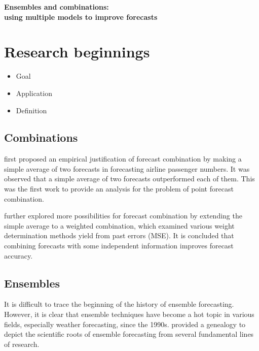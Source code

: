\documentclass[11pt]{article}
\begin{document}
\def\spacingset#1{\renewcommand{\baselinestretch}%
{#1}\small\normalsize} \spacingset{1}

\begin{center}
{\bf\Large Ensembles and combinations:\\using multiple models to improve forecasts}
\end{center}


\bigskip


\spacingset{1.5} 

\section{Research beginnings}
\begin{itemize}
\item Goal
\item Application
\item Definition
\end{itemize}

\subsection{Combinations}

\cite{barnard1963new} first proposed an empirical justification of forecast combination by making a simple average of two forecasts in forecasting airline passenger numbers. It was observed that a simple average of two forecasts outperformed each of them. This was the first work to provide an analysis for the problem of point forecast combination.

\cite{bates1969combination} further explored more possibilities for forecast combination by extending the simple average to a weighted combination, which examined various weight determination methods yield from past errors (MSE). It is concluded that combining forecasts with some independent information improves forecast accuracy.

\subsection{Ensembles}

It is difficult to trace the beginning of the history of ensemble forecasting. However, it is clear that ensemble techniques have become a hot topic in various fields, especially weather forecasting, since the 1990s. \cite{lewis2005roots} provided a genealogy to depict the scientific roots of ensemble forecasting from several fundamental lines of research.
\end{document}
